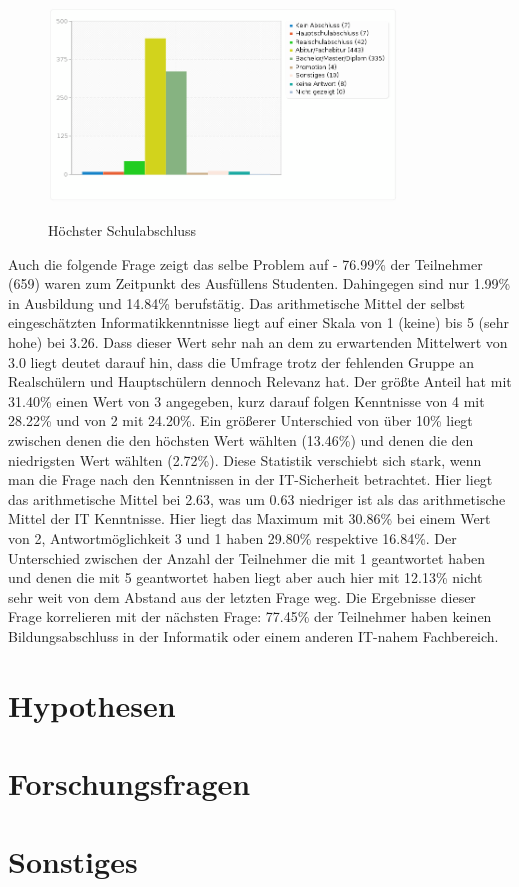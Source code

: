 \begin{figure}[H]
\centering
\includegraphics[scale=0.55]{images/schulabschluss}\\
\caption{Höchster Schulabschluss}\label{schulabschluss}
\end{figure}
Auch die folgende Frage zeigt das selbe Problem auf - 76.99\% der Teilnehmer (659) waren zum Zeitpunkt des Ausfüllens Studenten. Dahingegen sind nur 1.99\% in Ausbildung und 14.84\% berufstätig.
Das arithmetische Mittel der selbst eingeschätzten Informatikkenntnisse liegt auf einer Skala von 1 (keine) bis 5 (sehr hohe) bei 3.26. Dass dieser Wert sehr nah an dem zu erwartenden Mittelwert von 3.0 liegt deutet darauf hin, dass die Umfrage trotz der fehlenden Gruppe an Realschülern und Hauptschülern dennoch Relevanz hat. Der größte Anteil hat mit 31.40\% einen Wert von 3 angegeben, kurz darauf folgen Kenntnisse von 4 mit 28.22\% und von 2 mit 24.20\%. Ein größerer Unterschied von über 10\% liegt zwischen denen die den höchsten Wert wählten (13.46\%) und denen die den niedrigsten Wert wählten (2.72\%).
Diese Statistik verschiebt sich stark, wenn man die Frage nach den Kenntnissen in der IT-Sicherheit betrachtet. Hier liegt das arithmetische Mittel bei 2.63, was um 0.63 niedriger ist als das arithmetische Mittel der IT Kenntnisse. Hier liegt das Maximum mit 30.86\% bei einem Wert von 2, Antwortmöglichkeit 3 und 1 haben 29.80\% respektive 16.84\%. Der Unterschied zwischen der Anzahl der Teilnehmer die mit 1 geantwortet haben und denen die mit 5 geantwortet haben liegt aber auch hier mit 12.13\% nicht sehr weit von dem Abstand aus der letzten Frage weg.
Die Ergebnisse dieser Frage korrelieren mit der nächsten Frage: 77.45\% der Teilnehmer haben keinen Bildungsabschluss in der Informatik oder einem anderen IT-nahem Fachbereich.

\section{Hypothesen}

\section{Forschungsfragen}


\section{Sonstiges}
